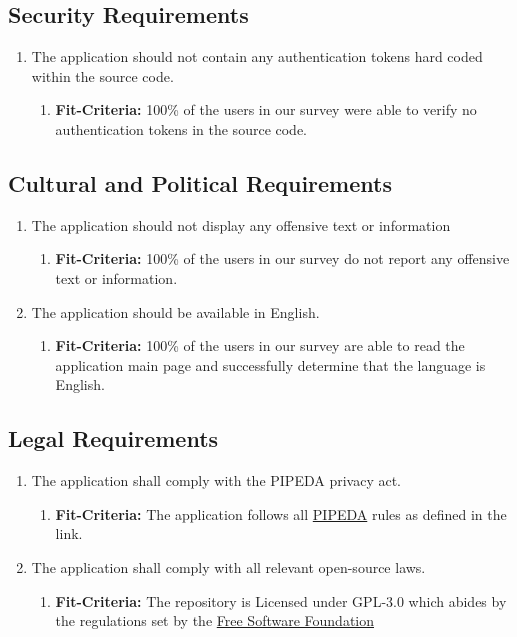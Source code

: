 \documentclass{article}
\begin{document}
\subsection{Security Requirements}
\begin{enumerate}
\item The application should not contain any authentication tokens hard coded within the source code. 
   \begin{enumerate}
    \item \textbf{Fit-Criteria:}  100\% of the users in our survey were able to verify no authentication tokens in the source code.
    \end{enumerate}
\end{enumerate}

\subsection{Cultural and Political Requirements}
\begin{enumerate}
\item The application should not display any offensive text or information 
   \begin{enumerate}
    \item \textbf{Fit-Criteria:}  100\% of the users in our survey do not report any offensive text or information. 
    \end{enumerate}
\item The application should be available in English. 
   \begin{enumerate}
    \item \textbf{Fit-Criteria:}  100\% of the users in our survey are able to read the application main page and successfully determine that the language is English. 
    \end{enumerate}
\end{enumerate}


\subsection{Legal Requirements}
\begin{enumerate}
\item The application shall comply with the PIPEDA privacy act.
   \begin{enumerate}
    \item \textbf{Fit-Criteria:}  The application follows all  \href{https://www.priv.gc.ca/en/privacy-topics/privacy-laws-in-canada/the-personal-information-protection-and-electronic-documents-act-pipeda/}{PIPEDA} rules as defined in the link.
    \end{enumerate}
\item The application shall comply with all relevant open-source laws. 
   \begin{enumerate}
    \item \textbf{Fit-Criteria:}  The repository is Licensed under GPL-3.0 which abides by the regulations set by the \href{https://www.fsf.org/}{Free Software Foundation} 
    \end{enumerate}
\end{enumerate}
\end{document}
